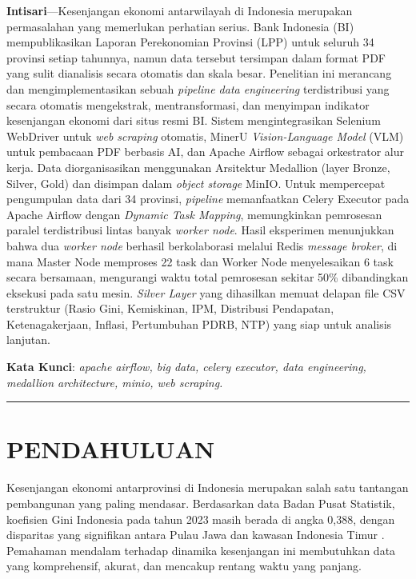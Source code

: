 \documentclass[10pt, a4paper, twocolumn]{article}
\begin{document}
\noindent\textbf{Intisari}---Kesenjangan ekonomi antarwilayah di Indonesia merupakan permasalahan yang memerlukan perhatian serius. Bank Indonesia (BI) mempublikasikan Laporan Perekonomian Provinsi (LPP) untuk seluruh 34 provinsi setiap tahunnya, namun data tersebut tersimpan dalam format PDF yang sulit dianalisis secara otomatis dan skala besar. Penelitian ini merancang dan mengimplementasikan sebuah \textit{pipeline data engineering} terdistribusi yang secara otomatis mengekstrak, mentransformasi, dan menyimpan indikator kesenjangan ekonomi dari situs resmi BI. Sistem mengintegrasikan Selenium WebDriver untuk \textit{web scraping} otomatis, MinerU \textit{Vision-Language Model} (VLM) untuk pembacaan PDF berbasis AI, dan Apache Airflow sebagai orkestrator alur kerja. Data diorganisasikan menggunakan Arsitektur Medallion (layer Bronze, Silver, Gold) dan disimpan dalam \textit{object storage} MinIO. Untuk mempercepat pengumpulan data dari 34 provinsi, \textit{pipeline} memanfaatkan Celery Executor pada Apache Airflow dengan \textit{Dynamic Task Mapping}, memungkinkan pemrosesan paralel terdistribusi lintas banyak \textit{worker node}. Hasil eksperimen menunjukkan bahwa dua \textit{worker node} berhasil berkolaborasi melalui Redis \textit{message broker}, di mana Master Node memproses 22 task dan Worker Node menyelesaikan 6 task secara bersamaan, mengurangi waktu total pemrosesan sekitar 50\% dibandingkan eksekusi pada satu mesin. \textit{Silver Layer} yang dihasilkan memuat delapan file CSV terstruktur (Rasio Gini, Kemiskinan, IPM, Distribusi Pendapatan, Ketenagakerjaan, Inflasi, Pertumbuhan PDRB, NTP) yang siap untuk analisis lanjutan.

\smallskip
\noindent\textbf{Kata Kunci}: \textit{apache airflow, big data, celery executor, data engineering, medallion architecture, minio, web scraping.}

\noindent\rule{\linewidth}{0.4pt}

\section{PENDAHULUAN}

Kesenjangan ekonomi antarprovinsi di Indonesia merupakan salah satu tantangan pembangunan yang paling mendasar. Berdasarkan data Badan Pusat Statistik, koefisien Gini Indonesia pada tahun 2023 masih berada di angka 0,388, dengan disparitas yang signifikan antara Pulau Jawa dan kawasan Indonesia Timur \cite{bps2023}. Pemahaman mendalam terhadap dinamika kesenjangan ini membutuhkan data yang komprehensif, akurat, dan mencakup rentang waktu yang panjang.
\end{document}
